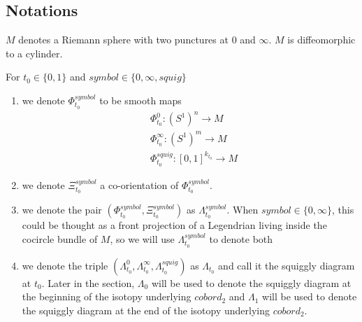 \subsection*{Notations}
\begin{definition}
$M$ denotes a Riemann sphere with two punctures at $0$ and $\infty$. $M$ is diffeomorphic to a cylinder.
\end{definition}
\begin{definition}
For $t_0\in\{0,1\}$ and $symbol\in\{0,\infty, squig \}$
\begin{enumerate}
\item we denote $\Phi_{t_0}^{symbol}$ to be smooth maps
\begin{align*}
&\Phi_{t_0}^0 : (S^1)^n \rightarrow M \\
&\Phi_{t_0}^\infty : (S^1)^m \rightarrow M \\
&\Phi_{t_0}^{squig} : [0,1]^{k_{t_0}} \rightarrow M
\end{align*}

\item we denote $\Xi_{t_0}^{symbol}$ a co-orientation of $\Phi_{t_0}^{symbol}$.

\item we denote the pair $(\Phi_{t_0}^{symbol},\Xi_{t_0}^{symbol})$ as $\Lambda_{t_0}^{symbol}$. When $symbol \in \{0,\infty\}$, this could be thought as a front projection of a Legendrian living inside the cocircle bundle of $M$, so we will use $\Lambda_{t_0}^{symbol}$ to denote both

\item we denote the triple $(\Lambda_{t_0}^{0},\Lambda_{t_0}^{\infty},\Lambda_{t_0}^{squig})$ as $\Lambda_{t_0}$ and call it the squiggly diagram at $t_0$. Later in the section, $\Lambda_0$ will be used to denote the squiggly diagram at the beginning of the isotopy underlying $cobord_2$ and $\Lambda_1$ will be used to denote the squiggly diagram at the end of the isotopy underlying $cobord_2$. 
\end{enumerate}
\end{definition}


